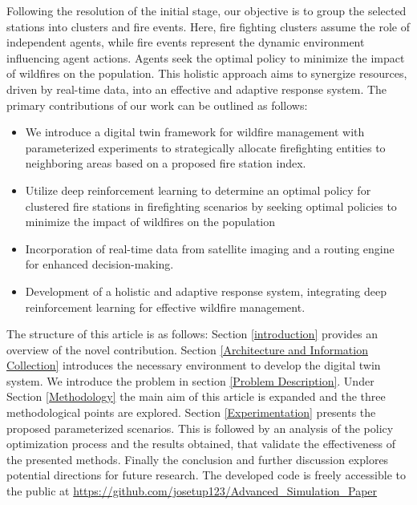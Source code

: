 \documentclass[lettersize,journal]{IEEEtran}
\begin{document}
Following the resolution of the initial stage, our objective is to group the selected stations into clusters and fire events. Here, fire fighting clusters assume the role of independent agents, while fire events represent the dynamic environment influencing agent actions. Agents seek the optimal policy to minimize the impact of wildfires on the population. This holistic approach aims to synergize resources, driven by real-time data, into an effective and adaptive response system. The primary contributions of our work can be outlined as follows:

\begin{itemize}
    \item We introduce a digital twin framework for wildfire management with parameterized experiments to strategically allocate firefighting entities to neighboring areas based on a proposed fire station index.

    \item Utilize deep reinforcement learning to determine an optimal policy for clustered fire stations in firefighting scenarios by seeking optimal policies to minimize the impact of wildfires on the population

    \item Incorporation of real-time data from satellite imaging and a routing engine for enhanced decision-making.
    
    \item Development of a holistic and adaptive response system, integrating deep reinforcement learning for effective wildfire management.
    



    
\end{itemize}


The structure of this article is as follows: Section \ref{introduction} provides an overview of the novel contribution. Section \ref{Architecture and Information Collection} introduces the necessary environment to develop the digital twin system. We introduce the problem in section \ref{Problem Description}. Under Section \ref{Methodology} the main aim of this article is expanded and the three methodological points are explored. Section \ref{Experimentation} presents the proposed parameterized scenarios. This is followed by an analysis of the policy optimization process and the results obtained, that validate the effectiveness of the presented methods. Finally the conclusion and further discussion explores potential directions for future research. The developed code is freely accessible to the public at \url{https://github.com/josetup123/Advanced_Simulation_Paper}
\end{document}
